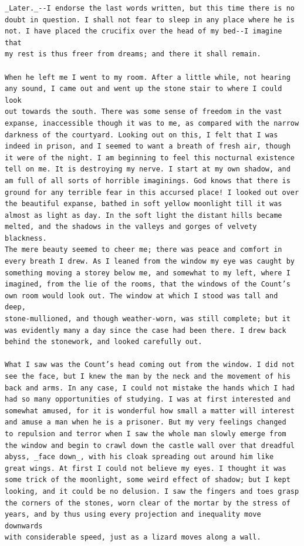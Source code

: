\documentclass{article}
\begin{document}
\begin{verbatim}
_Later._--I endorse the last words written, but this time there is no
doubt in question. I shall not fear to sleep in any place where he is
not. I have placed the crucifix over the head of my bed--I imagine that
my rest is thus freer from dreams; and there it shall remain.

When he left me I went to my room. After a little while, not hearing
any sound, I came out and went up the stone stair to where I could look
out towards the south. There was some sense of freedom in the vast
expanse, inaccessible though it was to me, as compared with the narrow
darkness of the courtyard. Looking out on this, I felt that I was
indeed in prison, and I seemed to want a breath of fresh air, though
it were of the night. I am beginning to feel this nocturnal existence
tell on me. It is destroying my nerve. I start at my own shadow, and
am full of all sorts of horrible imaginings. God knows that there is
ground for any terrible fear in this accursed place! I looked out over
the beautiful expanse, bathed in soft yellow moonlight till it was
almost as light as day. In the soft light the distant hills became
melted, and the shadows in the valleys and gorges of velvety blackness.
The mere beauty seemed to cheer me; there was peace and comfort in
every breath I drew. As I leaned from the window my eye was caught by
something moving a storey below me, and somewhat to my left, where I
imagined, from the lie of the rooms, that the windows of the Count’s
own room would look out. The window at which I stood was tall and deep,
stone-mullioned, and though weather-worn, was still complete; but it
was evidently many a day since the case had been there. I drew back
behind the stonework, and looked carefully out.

What I saw was the Count’s head coming out from the window. I did not
see the face, but I knew the man by the neck and the movement of his
back and arms. In any case, I could not mistake the hands which I had
had so many opportunities of studying. I was at first interested and
somewhat amused, for it is wonderful how small a matter will interest
and amuse a man when he is a prisoner. But my very feelings changed
to repulsion and terror when I saw the whole man slowly emerge from
the window and begin to crawl down the castle wall over that dreadful
abyss, _face down_, with his cloak spreading out around him like
great wings. At first I could not believe my eyes. I thought it was
some trick of the moonlight, some weird effect of shadow; but I kept
looking, and it could be no delusion. I saw the fingers and toes grasp
the corners of the stones, worn clear of the mortar by the stress of
years, and by thus using every projection and inequality move downwards
with considerable speed, just as a lizard moves along a wall.


\end{verbatim}
\end{document}

